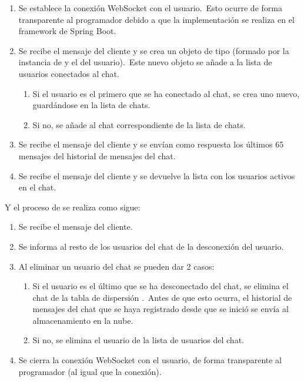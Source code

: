 \begin{enumerate}
	\item Se establece la conexión WebSocket con el usuario.\ Esto ocurre de forma transparente al programador debido a
	que la implementación se realiza en el framework de Spring Boot.
	\item Se recibe el mensaje  del cliente y se crea un objeto de tipo 
	(formado por la instancia de  y el  del usuario).\ Este nuevo
	objeto se añade a la lista de usuarios conectados al chat.
	\begin{enumerate}
		\item Si el usuario es el primero que se ha conectado al chat, se crea uno nuevo, guardándose en la lista de
		chats.
		\item Si no, se añade al chat correspondiente de la lista de chats.
	\end{enumerate}
	\item Se recibe el mensaje  del cliente y se envían como respuesta los últimos 65
	mensajes del historial de mensajes del chat.
	\item Se recibe el mensaje  del cliente y se devuelve la lista con los usuarios
	activos en el chat.
\end{enumerate}
\label{itm:backend-connection-life-cycle}
Y el proceso de  se realiza como sigue:

\begin{enumerate}
	\item Se recibe el mensaje  del cliente.
	\item Se informa al resto de los usuarios del chat de la desconexión del usuario.
	\item Al eliminar un usuario del chat se pueden dar 2 casos:
	\begin{enumerate}
		\item Si el usuario es el último que se ha desconectado del chat, se elimina el chat de la tabla de dispersión
		.\ Antes de que esto ocurra, el historial de mensajes del chat que se haya registrado desde
		que se inició se envía al almacenamiento en la nube.
		\item Si no, se elimina el usuario de la lista de usuarios del chat.
	\end{enumerate}
	\item Se cierra la conexión WebSocket con el usuario, de forma transparente al programador (al igual que la
	conexión).
\end{enumerate}

